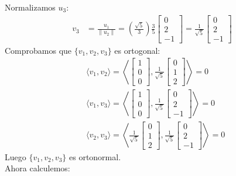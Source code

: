 \documentclass[11pt,letterpaper]{article}
\begin{document}
Normalizamos $u_3$:
\begin{align*}
v_3&=\frac{u_1}{\|u_2\|}=\left(\frac{\sqrt{5}}{3}\right)\frac{3}{5}\begin{bmatrix} 0\\2\\-1 \end{bmatrix}=\frac{1}{\sqrt{5}}\begin{bmatrix} 0\\2\\-1 \end{bmatrix}
\end{align*}
Comprobamos que $\{v_1,v_2,v_3\}$ es ortogonal:
\begin{align*}
    &\langle v_1,v_2 \rangle = \left\langle \begin{bmatrix} 1\\0\\0 \end{bmatrix},\frac{1}{\sqrt{5}}\begin{bmatrix} 0\\1\\2 \end{bmatrix} \right\rangle = 0\\
    &\langle v_1,v_3 \rangle = \left\langle \begin{bmatrix} 1\\0\\0 \end{bmatrix},\frac{1}{\sqrt{5}}\begin{bmatrix} 0\\2\\-1 \end{bmatrix} \right\rangle = 0\\
    &\langle v_2,v_3 \rangle = \left\langle \frac{1}{\sqrt{5}}\begin{bmatrix} 0\\1\\2 \end{bmatrix},\frac{1}{\sqrt{5}}\begin{bmatrix} 0\\2\\-1 \end{bmatrix} \right\rangle = 0
\end{align*}
Luego $\{v_1,v_2,v_3\}$ es ortonormal.\\[10pt]
Ahora calculemos:
\end{document}
